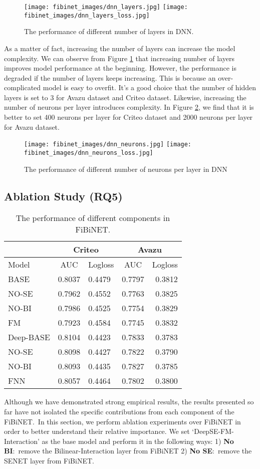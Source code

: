 \documentclass[sigconf]{acmart}
\begin{document}
\begin{figure}
\texttt{[image: fibinet\_images/dnn\_layers.jpg]}  
\texttt{[image: fibinet\_images/dnn\_layers\_loss.jpg]}
\caption{The performance of different number of layers in DNN.}
\label{fig:f4}
\end{figure}
As a matter of fact, increasing the number of layers can increase the
model complexity. We can observe from Figure \ref{fig:f4} that increasing number of layers improves model performance at the beginning. However, the
performance is degraded if the number of layers keeps increasing. This
is because an over-complicated model is easy to overfit. It's a good
choice that the number of hidden layers is set to 3 for Avazu dataset
and Criteo dataset. Likewise, increasing the number of neurons per layer introduces complexity. In Figure \ref{fig:f5}, we find that it is better to set 400 neurons per layer for Criteo dataset and 2000 neurons per layer for Avazu dataset.



\begin{figure}
\texttt{[image: fibinet\_images/dnn\_neurons.jpg]}  
\texttt{[image: fibinet\_images/dnn\_neurons\_loss.jpg]}
\caption{The performance of different number of neurons per layer in DNN}
\label{fig:f5}
\end{figure}

\subsection{Ablation Study (RQ5)}

\label{sec:s5}
\begin{table}[!htp]
\centering
  \caption{The performance of different components in FiBiNET.}
  \label{table:t51}
  \begin{tabular}{lclcr}
    \toprule
     &\multicolumn{2}{c}{Criteo}&\multicolumn{2}{c}{Avazu}\\
    \hline
     Model & AUC & Logloss & AUC & Logloss\\
    \midrule
BASE & 0.8037 & 0.4479 & 0.7797 & 0.3812\tabularnewline
NO-SE & 0.7962 & 0.4552 & 0.7763 & 0.3825\tabularnewline
NO-BI & 0.7986 & 0.4525 & 0.7754 & 0.3829\tabularnewline
FM & 0.7923 & 0.4584 & 0.7745 & 0.3832\tabularnewline
\hline
Deep-BASE & 0.8104 & 0.4423 & 0.7833 &
0.3783\tabularnewline
NO-SE & 0.8098 & 0.4427 & 0.7822 & 0.3790\tabularnewline
NO-BI & 0.8093 & 0.4435 & 0.7827 & 0.3785\tabularnewline
FNN & 0.8057 & 0.4464 & 0.7802 & 0.3800\tabularnewline
  \bottomrule
\end{tabular}
\end{table}
Although we have demonstrated strong empirical results, the results presented so far have not isolated the specific contributions from each component of the FiBiNET.\ In this section, we perform ablation experiments over FiBiNET in order to better understand their relative importance. We set `DeepSE-FM-Interaction' as the base model and perform it in the following ways:
1) \textbf{No BI}:\ remove the Bilinear-Interaction layer from FiBiNET 
2)  \textbf{No SE}:\ remove the SENET layer from FiBiNET.
\end{document}
